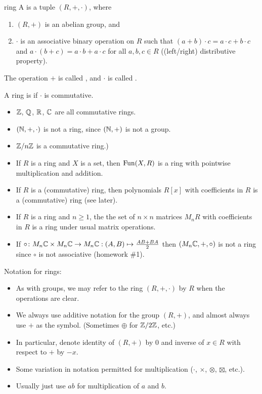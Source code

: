 \documentclass[12pt,letterpaper]{report}
\begin{document}
\begin{defn}{ring}{}
  A  is a tuple $(R, +, \cdot)$, where
  \begin{enumerate}
    \item $(R, +)$ is an abelian group, and
    \item $\cdot$ is an associative binary operation on $R$ such that
      $(a + b) \cdot c = a \cdot c + b \cdot c$ and $a \cdot (b + c) = a \cdot b + a \cdot c$ for
      all $a, b, c \in R$ ((left/right) distributive property).
  \end{enumerate}
  The operation $+$ is called , and $\cdot$ is called .

  A ring is  if $\cdot$ is commutative.
\end{defn}

\begin{ex}
  \begin{itemize}
    \item $\mathbb{Z}$, $\mathbb{Q}$, $\mathbb{R}$, $\mathbb{C}$ are all commutative rings.
    \item $(\mathbb{N}, +, \cdot)$ is not a ring, since $(\mathbb{N}, +)$ is not a group.
    \item $\mathbb{Z}/{n}\mathbb{Z}$ is a commutative ring.)
    \item If $R$ is a ring and $X$ is a set, then $\operatorname{Fun}(X, R)$ is a ring with pointwise
      multiplication and addition.
    \item If $R$ is a (commutative) ring, then polynomials $R[x]$ with coefficients in $R$ is a
      (commutative) ring (see later).
    \item If $R$ is a ring and $n \geq 1$, the the set of $n \times n$ matrices $M_nR$ with
      coefficients in $R$ is a ring under usual matrix operations.
    \item If $\circ \colon M_n\mathbb{C} \times M_n\mathbb{C} \to M_n\mathbb{C} :
      (A, B) \mapsto \frac{AB + BA}{2}$ then $(M_n\mathbb{C}, +, \circ)$ is not a ring since $\circ$
      is not associative (homework \#1).
  \end{itemize}
\end{ex}

Notation for rings:
\begin{itemize}
  \item As with groups, we may refer to the ring $(R, +, \cdot)$ by $R$ when the operations are
    clear.
  \item We always use additive notation for the group $(R, +)$, and almost always use $+$ as the
    symbol.
    (Sometimes $\oplus$ for $\mathbb{Z}/{2}\mathbb{Z}$, etc.)
  \item In particular, denote identity of $(R, +)$ by 0 and inverse of $x \in R$ with respect to
    $+$ by $-x$.
  \item Some variation in notation permitted for multiplication ($\cdot$, $\times$, $\otimes$,
    $\boxtimes$, etc.).
  \item Usually just use $ab$ for multiplication of $a$ and $b$.
\end{itemize}
\end{document}
